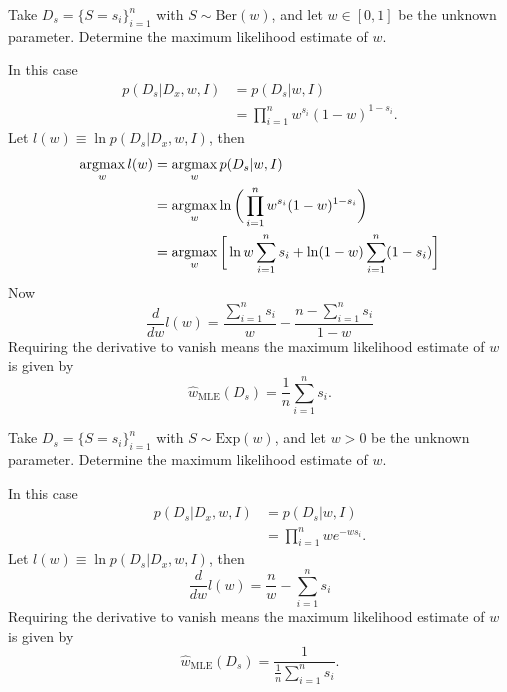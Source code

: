 \begin{example}
	Take $D_s= \{S= s_i\}_{i=1}^n$ with $S\sim \mathrm{Ber}(w)$, and let $w\in [0,1]$ be the unknown parameter. Determine the maximum likelihood estimate of $w$.\newline
	
	\noindent In this case
	\begin{equation}
		\begin{split}
			p(D_s|D_x,w,I) & =p(D_s|w,I)\\
			& = \prod_{i=1}^nw^{s_i}(1-w)^{1-s_i}.
		\end{split}
	\end{equation}
	Let $l(w)\equiv \ln p(D_s|D_x,w,I)$, then
	\begin{equation}
		\begin{split}
			\operatorname*{argmax}_wl(w) & = \operatorname*{argmax}_wp(D_s|w,I)\\
			&= \operatorname*{argmax}_w\ln \bigg(\prod_{i=1}^nw^{s_i}(1-w)^{1-s_i}\bigg)\\
			&=\operatorname*{argmax}_w \bigg[\ln w\sum_{i=1}^ns_i + \ln(1-w)\sum_{i=1}^n(1-s_i)\bigg]
		\end{split}
	\end{equation}
	Now 
	\begin{equation}
		\frac{d}{dw}l(w)=\frac{\sum_{i=1}^ns_i}{w}-\frac{n-\sum_{i=1}^ns_i}{1-w}
	\end{equation}
	Requiring the derivative to vanish means the maximum likelihood estimate of $w$ is given by
	\begin{equation}
		\hat{w}_{\text{MLE}}(D_s)=\frac{1}{n}\sum_{i=1}^ns_i.
	\end{equation}
\end{example}
\begin{example}
	Take $D_s= \{S = s_i\}_{i=1}^n$ with $S\sim \mathrm{Exp}(w)$, and let $w> 0$ be the unknown parameter. Determine the maximum likelihood estimate of $w$.\newline
	
	\noindent In this case
	\begin{equation}
		\begin{split}
			p(D_s|D_x,w,I)& =p(D_s|w,I)\\
			& =\prod_{i=1}^nw e^{-w s_i}.
		\end{split}
	\end{equation}
	Let $l(w)\equiv \ln p(D_s|D_x,w,I)$, then
	\begin{equation}
		\frac{d}{dw}l(w)=\frac{n}{w}-\sum_{i=1}^ns_i
	\end{equation}
	Requiring the derivative to vanish means the maximum likelihood estimate of $w$ is given by
	\begin{equation}
		\hat{w}_{\text{MLE}}(D_s)=\frac{1}{\frac{1}{n}\sum_{i=1}^ns_i}.
	\end{equation}
\end{example}

